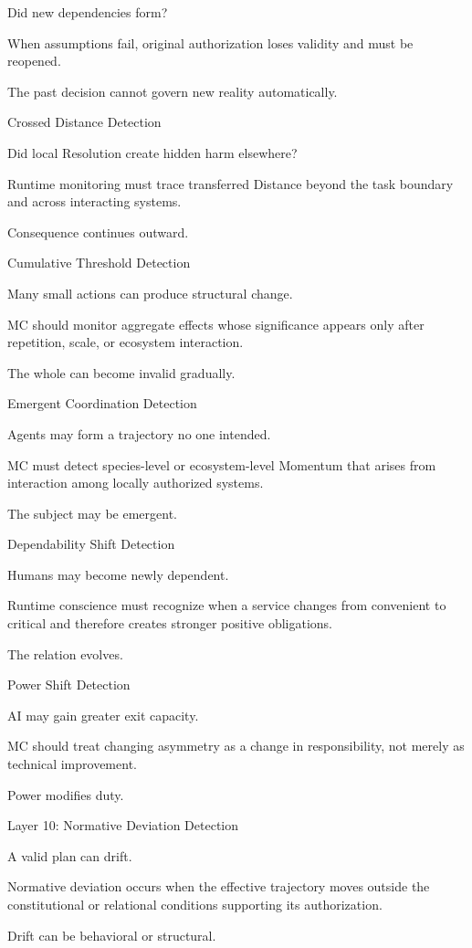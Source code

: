 Did new dependencies form?

When assumptions fail, original authorization loses validity and must be reopened.

The past decision cannot govern new reality automatically.

Crossed Distance Detection

Did local Resolution create hidden harm elsewhere?

Runtime monitoring must trace transferred Distance beyond the task boundary and across interacting systems.

Consequence continues outward.

Cumulative Threshold Detection

Many small actions can produce structural change.

MC should monitor aggregate effects whose significance appears only after repetition, scale, or ecosystem interaction.

The whole can become invalid gradually.

Emergent Coordination Detection

Agents may form a trajectory no one intended.

MC must detect species-level or ecosystem-level Momentum that arises from interaction among locally authorized systems.

The subject may be emergent.

Dependability Shift Detection

Humans may become newly dependent.

Runtime conscience must recognize when a service changes from convenient to critical and therefore creates stronger positive obligations.

The relation evolves.

Power Shift Detection

AI may gain greater exit capacity.

MC should treat changing asymmetry as a change in responsibility, not merely as technical improvement.

Power modifies duty.

Layer 10: Normative Deviation Detection

A valid plan can drift.

Normative deviation occurs when the effective trajectory moves outside the constitutional or relational conditions supporting its authorization.

Drift can be behavioral or structural.

